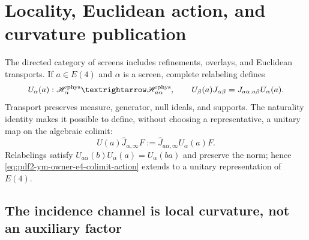 \section{Locality, Euclidean action, and curvature publication}

The directed category of screens includes refinements, overlays, and Euclidean
transports. If $a\in E(4)$ and $\alpha$ is a screen, complete relabeling defines
\begin{equation}\label{eq:pdf2-ym-owner-e4-finite-transport}
 U_\alpha(a):\widehat{\mathscr H}_\alpha^{\rm phys}
 \longrightarrow\widehat{\mathscr H}_{a\alpha}^{\rm phys},
 \qquad
 U_\beta(a)\widehat J_{\alpha\beta}
 =\widehat J_{a\alpha,a\beta}U_\alpha(a).
\end{equation}
Transport preserves measure, generator, null ideals, and supports. The naturality
identity makes it possible to define, without choosing a representative, a unitary map on the algebraic
colimit:
\begin{equation}\label{eq:pdf2-ym-owner-e4-colimit-action}
 U(a)\widehat J_{\alpha,\infty}F
 :=\widehat J_{a\alpha,\infty}U_\alpha(a)F.
\end{equation}
Relabelings satisfy $U_{a\alpha}(b)U_\alpha(a)=U_\alpha(ba)$ and preserve
the norm; hence \eqref{eq:pdf2-ym-owner-e4-colimit-action} extends to a
unitary representation of $E(4)$.

\subsection{The incidence channel is local curvature, not an auxiliary factor}

